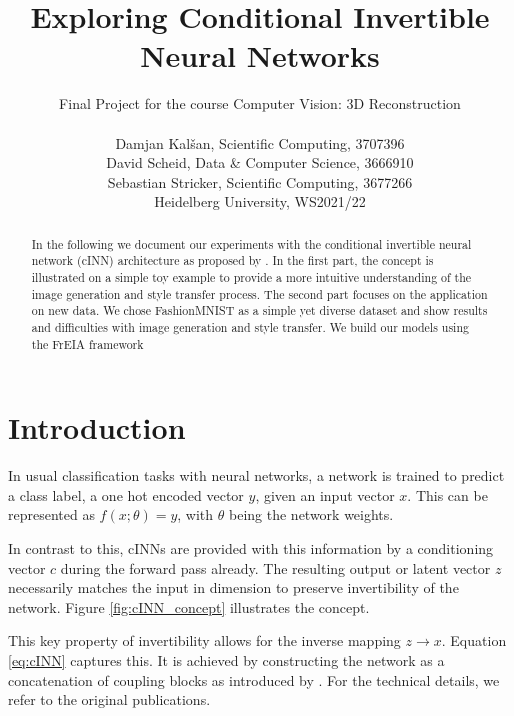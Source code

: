 \documentclass[final]{cvpr}
\begin{document}
\title{Exploring Conditional Invertible Neural Networks \\}

\author{
Final Project for the course Computer Vision: 3D Reconstruction\\\\
Damjan Kalšan, Scientific Computing, 3707396\\
David Scheid,  Data \& Computer Science, 3666910\\
Sebastian Stricker, Scientific Computing, 3677266\\
Heidelberg University, WS2021/22\\
}

\maketitle


\begin{abstract}
   In the following we document our experiments with the conditional invertible neural network (cINN) architecture as proposed by \cite{main_paper_CINN}.
   In the first part, the concept is illustrated on a simple toy example to provide a more intuitive understanding of the image generation and style transfer process.
   The second part focuses on the application on new data. We chose FashionMNIST \cite{fashion_mnist} as a simple yet diverse dataset and show results and difficulties with image generation and style transfer.
   We build our models using the FrEIA framework \cite{freia}
\end{abstract}

\section{Introduction}
In usual classification tasks with neural networks, a network is trained to predict a class label, a one hot encoded vector $y$, given an input vector $x$. This can be represented as $f(x; \theta) = y$, with $\theta$ being the network weights.

In contrast to this, cINNs are provided with this information by a conditioning vector $c$ during the forward pass already. The resulting output or latent vector $z$ necessarily matches the input in dimension to preserve invertibility of the network. Figure \ref{fig:cINN_concept} illustrates the concept.

This key property of invertibility allows for the inverse mapping  $z \rightarrow x$. Equation \ref{eq:cINN} captures this. It is achieved by constructing the network as a concatenation of coupling blocks as introduced by \cite{RealNVP}.
For the technical details, we refer to the original publications.
\end{document}
